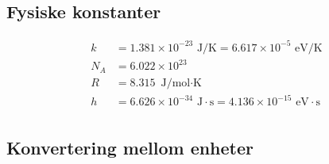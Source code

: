 \documentclass[12pt]{article}
\begin{document}
\subsection{Fysiske konstanter}
\begin{align*}
  k   &= 1.381 \times 10^{-23} \text{ J/K} = 6.617 \times 10^{-5} \text{ eV/K} \\
  N_A &= 6.022 \times 10^{23}        \\
  R   &= 8.315 \text{ J/mol$\cdot$K} \\
  h   &= 6.626 \times 10^{-34} \text{ J}\cdot\text{s} = 4.136 \times 10^{-15} \text{ eV}\cdot\text{s}\\
\end{align*}
\subsection{Konvertering mellom enheter}
\end{document}
